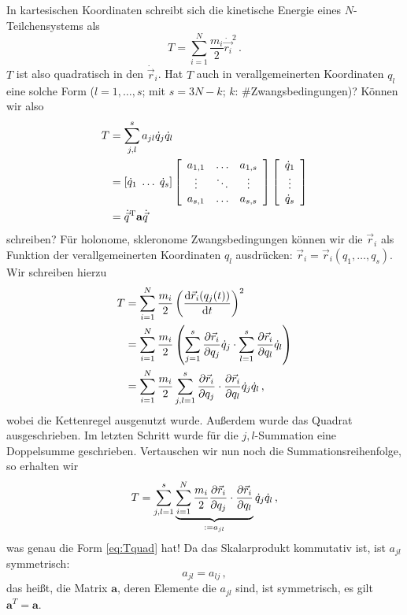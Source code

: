 \documentclass[paper=a4, fontsize=11.0pt, abstractoff, DIV12]{scrartcl}
\begin{document}
In kartesischen Koordinaten schreibt sich die kinetische Energie eines
$N$-Teilchensystems als
\begin{equation}
T = \sum\limits_{i=1}^{N} \frac{m_i}{2} \dot{\vec{r_i}}^2 \, .
\end{equation}
$T$ ist also quadratisch in den $\dot{\vec r}_i$. Hat $T$ auch in
verallgemeinerten Koordinaten $q_l$ eine solche Form ($l=1,\dots,s$; mit $s=3N-k$; $k$:
\#Zwangsbedingungen)? Können wir also
\begin{align}
T &= \sum\limits_{j,l}^{s} a_{jl} \dot{q}_j \dot{q}_l\nonumber\\
&= \left[ \dot{q}_1\; \dots\;\dot{q}_{s} \right] \threeMatrix{a_{1,1}}{\dots}{a_{1,s}}{\vdots}{\ddots}{\vdots}{a_{s,1}}{\dots}{a_{s, s}}
\DreierVec{\dot{q}_{1}}{\vdots}{\dot{q}_{s}}\nonumber\\
&= \dot{\vec{q}}^\mathrm{T} \mathbf{a} \dot{\vec{q}}
\label{eq:Tquad}
\end{align}
schreiben? Für holonome, skleronome Zwangsbedingungen können wir die $\vec r_i$
als Funktion der verallgemeinerten Koordinaten $q_l$ ausdrücken:
$\vec r_i = \vec r_i(q_1, \dots, q_{s})$. Wir schreiben hierzu
\begin{align}
T &=  \sum\limits_{i=1}^{N} \frac{m_i}{2} \left(\firstderiv{\vec{r}_i(q_j(t))}{t}\right)^2\nonumber\\
&= \sum\limits_{i=1}^{N} \frac{m_i}{2} \left( \sum\limits_{j=1}^{s} \firstpderiv{\vec{r}_i}{q_j}\dot{q}_j \cdot  \sum\limits_{l=1}^{s} \firstpderiv{\vec{r}_i}{q_l}\dot{q}_l \right)\nonumber\\
&= \sum\limits_{i=1}^{N} \frac{m_i}{2} \sum\limits_{j,l=1}^{s} \firstpderiv{\vec{r}_i}{q_j} \cdot \firstpderiv{\vec{r}_i}{q_l}\dot{q}_j \dot{q}_l \, ,
\end{align}
wobei die Kettenregel ausgenutzt wurde. Außerdem wurde das Quadrat
ausgeschrieben. Im letzten Schritt wurde für die $j,l$-Summation eine
Doppelsumme geschrieben. Vertauschen wir nun noch die Summationsreihenfolge,
so erhalten wir
\begin{equation}
T = \sum\limits_{j,l=1}^{s} \underbrace{\sum\limits_{i=1}^{N} \frac{m_i}{2} \firstpderiv{\vec{r}_i}{q_j} \cdot \firstpderiv{\vec{r}_i}{q_l}}_{:=a_{jl}} \dot{q}_j \dot{q}_l \, ,
\end{equation}
was genau die Form \eqref{eq:Tquad} hat! Da das Skalarprodukt kommutativ ist, 
ist $a_{jl}$ symmetrisch:
\begin{equation}
a_{jl} = a_{lj}\, ,
\end{equation}
das heißt, die Matrix $\mathbf{a}$, deren Elemente die $a_{jl}$ sind, ist
symmetrisch, es gilt $\mathbf{a}^{T} = \mathbf{a}$.
\end{document}
